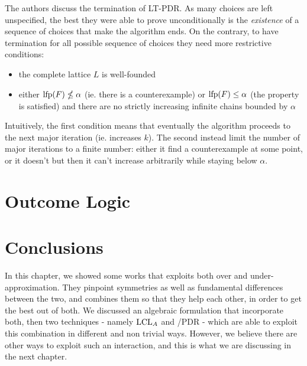 The authors discuss the termination of LT-PDR. As many choices are left unspecified, the best they were able to prove unconditionally is the \emph{existence} of a sequence of choices that make the algorithm ends. On the contrary, to have termination for all possible sequence of choices they need more restrictive conditions:
\begin{itemize}
	\item the complete lattice $L$ is well-founded
	\item either $\text{lfp}(F) \nleq \alpha$ (ie. there is a counterexample) or $\text{lfp}(F) \le \alpha$ (the property is satisfied) and there are no strictly increasing infinite chains bounded by $\alpha$
\end{itemize}
Intuitively, the first condition means that eventually the algorithm proceeds to the next major iteration (ie. increases $k$). The second instead limit the number of major iterations to a finite number: either it find a counterexample at some point, or it doesn't but then it can't increase arbitrarily while staying below $\alpha$.

\section{Outcome Logic}\label{sec:sota:ol}

\section{Conclusions}
In this chapter, we showed some works that exploits both over and under-approximation. They pinpoint symmetries as well as fundamental differences between the two, and combines them so that they help each other, in order to get the best out of both. We discussed an algebraic formulation that incorporate both, then two techniques - namely $\text{LCL}_A$ and /PDR - which are able to exploit this combination in different and non trivial ways. However, we believe there are other ways to exploit such an interaction, and this is what we are discussing in the next chapter.
